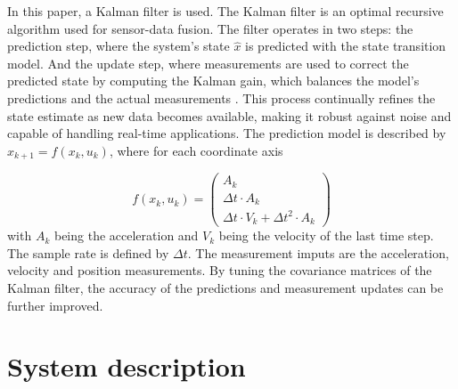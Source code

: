 \documentclass[engproc,conferenceproceedings,submit,pdftex,moreauthors]{Definitions/mdpi}
\begin{document}
In this paper, a Kalman filter is used. The Kalman filter is an optimal recursive algorithm used for sensor-data fusion. The filter operates in two steps: the prediction step, where the system's state $\hat{x}$ is predicted with the state transition model. And the update step, where measurements are used to correct the predicted state by computing the Kalman gain, which balances the model's predictions and the actual measurements \cite{chui2009}. This process continually refines the state estimate as new data becomes available, making it robust against noise and capable of handling real-time applications. The prediction model is described by  $x_{k+1} = f(x_{k},u_k)$, where for each coordinate axis 

\begin{equation}
	f(x_{k},u_k) = \begin{pmatrix}
		A_k \\
		\Delta t \cdot A_k \\
		\Delta t \cdot V_k + \Delta t^2 \cdot A_k
		
		\end{pmatrix}
\end{equation}
with $A_k$ being the acceleration and $V_k$ being the velocity of the last time step. The sample rate is defined by $\Delta t$. The measurement imputs are the acceleration, velocity and position measurements.
By tuning the covariance matrices of the Kalman filter, the accuracy of the predictions and measurement updates can be further improved.\\




\section{System description}

	
\end{document}
